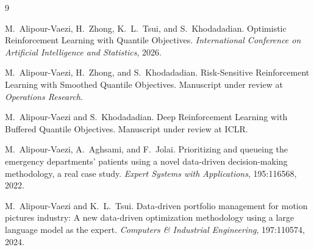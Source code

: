 \documentclass[11pt,letterpaper]{article}
\begin{document}
\begin{thebibliography}{9}

\small
\setlength{\itemsep}{2pt}
\setlength{\parskip}{0pt}

M.~Alipour-Vaezi, H.~Zhong, K.~L.~Tsui, and S.~Khodadadian.
Optimistic Reinforcement Learning with Quantile Objectives.
\emph{International Conference on Artificial Intelligence and Statistics},
2026.

M.~Alipour-Vaezi, H.~Zhong, and S.~Khodadadian.
Risk-Sensitive Reinforcement Learning with Smoothed Quantile Objectives.
Manuscript under review at \emph{Operations Research}.

M.~Alipour-Vaezi and S.~Khodadadian.
Deep Reinforcement Learning with Buffered Quantile Objectives.
Manuscript under review at ICLR.

M.~Alipour-Vaezi, A.~Aghsami, and F.~Jolai.
Prioritizing and queueing the emergency departments' patients using a
novel data-driven decision-making methodology, a real case study.
\emph{Expert Systems with Applications}, 195:116568, 2022.

M.~Alipour-Vaezi and K.~L.~Tsui.
Data-driven portfolio management for motion pictures industry:
A new data-driven optimization methodology using a large language
model as the expert.
\emph{Computers \& Industrial Engineering}, 197:110574, 2024.

\end{thebibliography}
\end{document}
